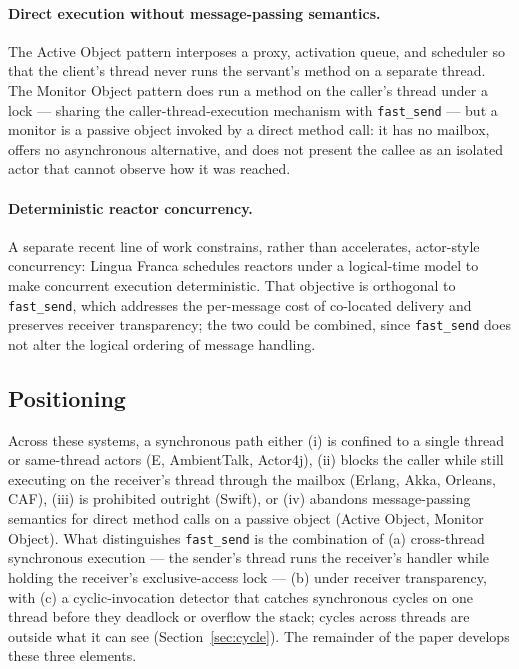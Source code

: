 \documentclass[11pt]{article}
\newcommand{\fs}{\texttt{fast\_send}}
\begin{document}
\paragraph{Direct execution without message-passing semantics.} The Active
Object pattern \cite{activeobject1996} interposes a proxy, activation queue, and
scheduler so that the client's thread never runs the servant's method on a
separate thread. The Monitor Object pattern \cite{posa2} does run a method on the
caller's thread under a lock --- sharing the caller-thread-execution mechanism
with \fs{} --- but a monitor is a passive object invoked by a direct method
call: it has no mailbox, offers no asynchronous alternative, and does not present
the callee as an isolated actor that cannot observe how it was reached.

\paragraph{Deterministic reactor concurrency.} A separate recent line of work
constrains, rather than accelerates, actor-style concurrency: Lingua Franca
\cite{linguafranca2023} schedules reactors under a logical-time model to make
concurrent execution deterministic. That objective is orthogonal to \fs{}, which
addresses the per-message cost of co-located delivery and preserves receiver
transparency; the two could be combined, since \fs{} does not alter the logical
ordering of message handling.

\subsection{Positioning}
\label{sec:positioning}

Across these systems, a synchronous path either (i) is confined to a single
thread or same-thread actors (E, AmbientTalk, Actor4j), (ii) blocks the caller
while still executing on the receiver's thread through the mailbox (Erlang,
Akka, Orleans, CAF), (iii) is prohibited outright (Swift), or (iv) abandons
message-passing semantics for direct method calls on a passive object (Active
Object, Monitor Object). What distinguishes \fs{} is the combination of
(a) cross-thread synchronous execution --- the sender's thread runs the
receiver's handler while holding the receiver's exclusive-access lock ---
(b) under receiver transparency, with (c) a cyclic-invocation detector that
catches synchronous cycles on one thread before they deadlock or overflow the
stack; cycles across threads are outside what it can see
(Section~\ref{sec:cycle}). The remainder of the paper develops these three
elements.
\end{document}
